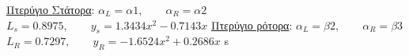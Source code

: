 \documentclass[12pt,a4paper,twoside]{extreport}
\begin{document}
\newline \underline{Πτερύγιο Στάτορα}:
\newline $α_L=α1, \qquad α_R=α2$
\newline $L_s=0.8975, \qquad \boxed{y_s=1.3434x^2-0.7143x}$
\newline \underline{Πτερύγιο ρότορα}:
\newline $α_L=β2, \qquad α_R=β3$
\newline $L_R=0.7297, \qquad \boxed{y_R=-1.6524x^2+0.2686x}$
\newline
\vspace{1cm}
s
\chapter{}
\chapter{}



\newpage
\end{document}
